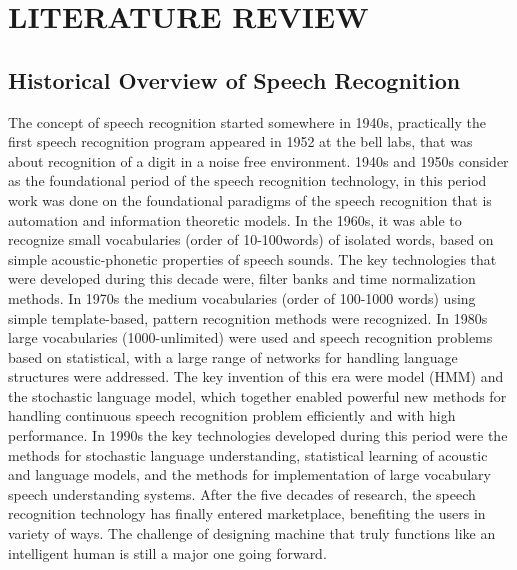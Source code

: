 
\section{LITERATURE REVIEW}

\subsection{Historical Overview of Speech Recognition}
The concept of speech recognition started somewhere in 1940s, practically the first speech recognition program appeared in 1952 at the bell labs, that was about recognition of a digit in a noise free environment. 1940s and 1950s consider as the foundational period of the speech recognition technology, in this period work was done on the foundational paradigms of the speech recognition that is automation and information theoretic models. In the 1960s, it was able to recognize small vocabularies (order of 10-100words) of isolated words, based on simple acoustic-phonetic properties of speech sounds. The key technologies that were developed during this decade were, filter banks and time normalization methods. In 1970s the medium vocabularies (order of 100-1000 words) using simple template-based, pattern recognition methods were recognized. In 1980s large vocabularies (1000-unlimited) were used and speech recognition problems based on statistical, with a large range of networks for handling language structures were addressed. The key invention of this era were   model (HMM) and the stochastic language model, which together enabled powerful new methods for handling continuous speech recognition problem efficiently and with high performance. In 1990s the key technologies developed during this period were the methods for stochastic language understanding, statistical learning of acoustic and language models, and the methods for implementation of large vocabulary speech understanding systems. After the five decades of research, the speech recognition technology has finally entered marketplace, benefiting the users in variety of ways. The challenge of designing machine that truly functions like an intelligent human is still a major one going forward.

